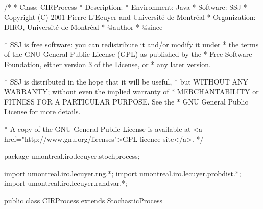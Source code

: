 \begin{code}
\begin{hide}
/*
 * Class:        CIRProcess
 * Description:  
 * Environment:  Java
 * Software:     SSJ 
 * Copyright (C) 2001  Pierre L'Ecuyer and Université de Montréal
 * Organization: DIRO, Université de Montréal
 * @author       
 * @since

 * SSJ is free software: you can redistribute it and/or modify it under
 * the terms of the GNU General Public License (GPL) as published by the
 * Free Software Foundation, either version 3 of the License, or
 * any later version.

 * SSJ is distributed in the hope that it will be useful,
 * but WITHOUT ANY WARRANTY; without even the implied warranty of
 * MERCHANTABILITY or FITNESS FOR A PARTICULAR PURPOSE.  See the
 * GNU General Public License for more details.

 * A copy of the GNU General Public License is available at
   <a href="http://www.gnu.org/licenses">GPL licence site</a>.
 */
\end{hide}
package umontreal.iro.lecuyer.stochprocess;\begin{hide}
import umontreal.iro.lecuyer.rng.*;
import umontreal.iro.lecuyer.probdist.*;
import umontreal.iro.lecuyer.randvar.*;

\end{hide}

public class CIRProcess extends StochasticProcess \begin{hide} {
    private RandomStream stream;
    protected ChiSquareNoncentralGen gen;
    protected double alpha,
                     beta,
                     sigma,
                     nu;     // number of degrees of freedom
    // Precomputed values
    protected double[] parc,
                       parlam;
\end{hide}
\end{code}
